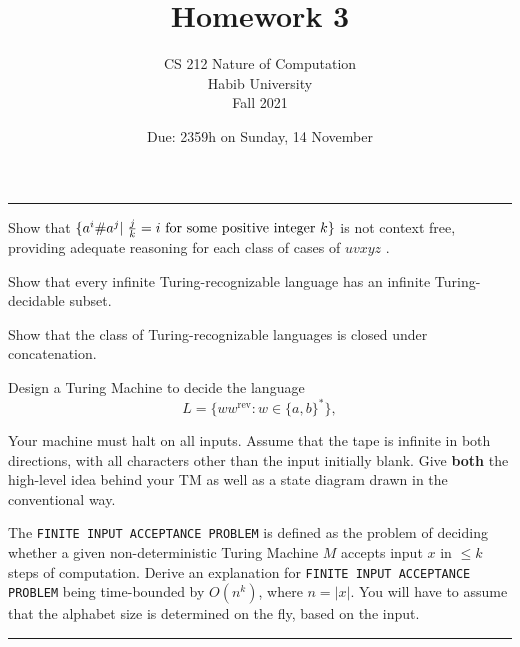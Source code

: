\documentclass[a4page]{exam}
\title{Homework 3}
\author{CS 212 Nature of Computation\\Habib University\\Fall 2021}
\date{Due: 2359h on Sunday, 14 November}
\begin{document}
\maketitle
\thispagestyle{empty}

\noindent\rule{\textwidth}{1pt}

\begin{questions}
  \question[20] Show that $\{a^i\#a^j | \hspace{1mm}\frac{j}{k} = i \text{ for some positive integer } k\}$ is not context free, providing adequate reasoning for each class of cases of $uvxyz$ .

  
  \question[20] Show that every infinite Turing-recognizable language has an infinite Turing-decidable subset.
  
  \question[20] Show that the class of Turing-recognizable languages is closed under concatenation.
  
  \question[20] Design a Turing Machine to decide the language
  \[
    L =\{ w w^{\text{rev}} : w \in \{a,b\}^* \},
  \]

  Your machine must halt on all inputs. Assume that the tape is infinite in both directions, with all characters other than the input initially blank. Give \textbf{both} the high-level idea behind your TM as well as a state diagram drawn in the conventional way. 
  
  \question[20] The \texttt{FINITE INPUT ACCEPTANCE PROBLEM} is defined as the problem of deciding whether a given non-deterministic Turing Machine $M$ accepts input $x$ in $\leq k$ steps of computation. Derive an explanation for \texttt{FINITE INPUT ACCEPTANCE PROBLEM} being time-bounded by $O(n^k)$, where $n=|x|$. You will have to assume that the alphabet size is determined on the fly, based on the input.
  

\end{questions}

\noindent\rule{\textwidth}{1pt}
\end{document}
